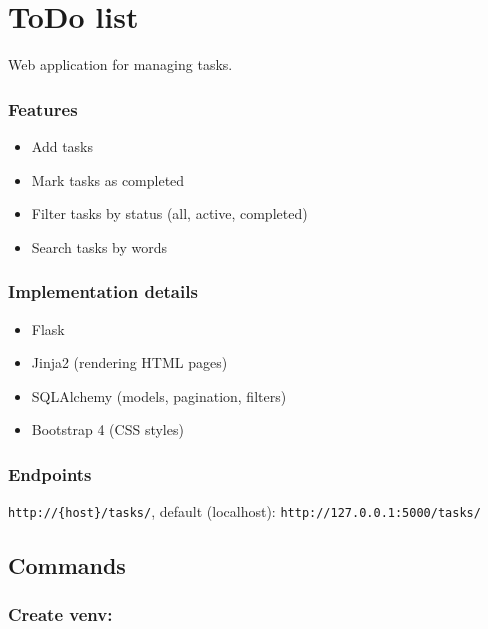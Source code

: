 \hypertarget{todo-list}{%
\section{ToDo list}\label{todo-list}}

Web application for managing tasks.

\hypertarget{features}{%
\subsubsection{Features}\label{features}}

\begin{itemize}
\tightlist
\item
  Add tasks
\item
  Mark tasks as completed
\item
  Filter tasks by status (all, active, completed)
\item
  Search tasks by words
\end{itemize}

\hypertarget{implementation-details}{%
\subsubsection{Implementation details}\label{implementation-details}}

\begin{itemize}
\tightlist
\item
  Flask
\item
  Jinja2 (rendering HTML pages)
\item
  SQLAlchemy (models, pagination, filters)
\item
  Bootstrap 4 (CSS styles)
\end{itemize}

\hypertarget{endpoints}{%
\subsubsection{Endpoints}\label{endpoints}}

\texttt{http://\{host\}/tasks/}, default (localhost):
\texttt{http://127.0.0.1:5000/tasks/}

\hypertarget{commands}{%
\subsection{Commands}\label{commands}}

\hypertarget{create-venv}{%
\subsubsection{Create venv:}\label{create-venv}}

